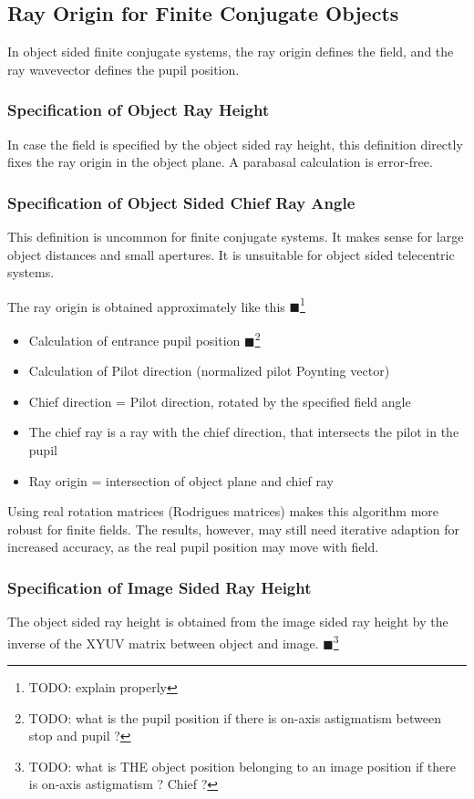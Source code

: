 \documentclass[12pt,a4paper,twoside,openright,BCOR10mm,headsepline,titlepage,abstracton,chapterprefix,final]{scrreprt}
\newcommand{\remark}[1]{{\color{red}$\blacksquare$}\footnote{{\color{red}#1}}}
\begin{document}
\subsection{Ray Origin for Finite Conjugate Objects}
In object sided finite conjugate systems, the ray origin defines the field, and the ray wavevector defines the pupil position.

\subsubsection{Specification of Object Ray Height}
In case the field is specified by the object sided ray height,
this definition directly fixes the ray origin in the object plane.
A parabasal calculation is error-free.

\subsubsection{Specification of Object Sided Chief Ray Angle}
This definition is uncommon for finite conjugate systems. 
It makes sense for large object distances and small apertures.
It is unsuitable for object sided telecentric systems.

The ray origin is obtained approximately like this \remark{TODO: explain properly}
\begin{itemize}
 \item Calculation of entrance pupil position 
       \remark{TODO: what is the pupil position if there is on-axis astigmatism between stop and pupil ?}
 \item Calculation of Pilot direction (normalized pilot Poynting vector)
 \item Chief direction = Pilot direction, rotated by the specified field angle
 \item The chief ray is a ray with the chief direction, that intersects the pilot in the pupil
 \item Ray origin = intersection of object plane and chief ray
\end{itemize}

Using real rotation matrices (Rodrigues matrices) makes this algorithm more robust for finite fields.
The results, however, may still need iterative adaption for increased accuracy, as the real pupil position may move with field.

\subsubsection{Specification of Image Sided Ray Height}
The object sided ray height is obtained from the image sided ray height by the inverse of the XYUV matrix between object and image.
\remark{TODO: what is THE object position belonging to an image position if there is on-axis astigmatism ? Chief ?}
\end{document}
